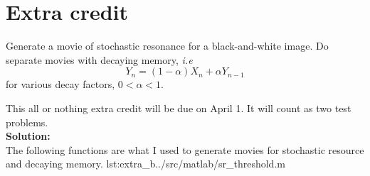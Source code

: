 \section*{Extra credit}

Generate a movie of stochastic resonance for a black-and-white image. Do separate movies with decaying memory, {\em i.e}
$$ Y_n = (1-\alpha) X_n + \alpha Y_{n-1}$$
for various decay factors, $0<\alpha<1$.

This all or nothing extra credit will be due on April 1. It will count as two test problems.\\
\textbf{Solution:}\\

The following functions are what I used to generate movies for stochastic resource and decaying memory.
                   {lst:extra_b}{../src/matlab/sr_threshold.m}
